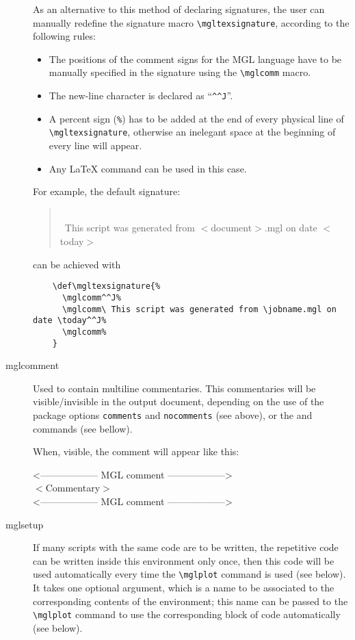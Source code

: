 \documentclass{article}
\begin{document}
\begin{description}
As an alternative to this method of declaring signatures, the user can manually redefine the signature macro \texttt{\textbackslash{}mgltexsignature}, according to the following rules:
  \begin{itemize}
    \item The positions of the comment signs for the MGL language have to be manually specified in the signature using the \texttt{\textbackslash{}mglcomm} macro.
    \item The new-line character is declared as ``\verb|^^J|''.
    \item A percent sign (\texttt{\%}) has to be added at the end of every physical line of \texttt{\textbackslash{}mgltexsignature}, otherwise an inelegant space at the beginning of every line will appear.
  \item Any \LaTeX{} command can be used in this case.
\end{itemize}
  For example, the default signature:
  \begin{mglcomment}
  \begin{quote}\small
    \mglcomm\\
    \mglcomm\ This script was generated from $<$document$>$.mgl on date $<$today$>$\\
    \mglcomm
  \end{quote}
  \end{mglcomment}
  can be achieved with
  \begin{verbatim}
    \def\mgltexsignature{%
      \mglcomm^^J%
      \mglcomm\ This script was generated from \jobname.mgl on date \today^^J%
      \mglcomm%
    }
  \end{verbatim}
\item[mglcomment]
  Used to contain multiline commentaries. This commentaries will be visible/invisible in the output document, depending on the use of the package options \texttt{comments} and \texttt{nocomments} (see above), or the \texttt{} and \texttt{} commands (see bellow).
  
  When, visible, the comment will appear like this:
  \begin{center}
    \makeatletter
    \verbatim@font
    \makeatother
    <------------------ MGL comment ------------------>\\
    $<$Commentary$>$\\
    <------------------ MGL comment ------------------>\\
  \end{center}
\item[mglsetup]
	If many scripts with the same code are to be written, the repetitive code can be written inside this environment only once, then this code will be used automatically every time the \texttt{\textbackslash{}mglplot} command is used (see below). It takes one optional argument, which is a name to be associated to the corresponding contents of the environment; this name can be passed to the \texttt{\textbackslash{}mglplot} command to use the corresponding block of code automatically (see below).
\end{description}
\end{document}
